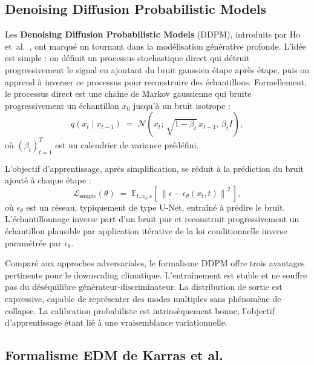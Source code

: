 \documentclass[14pt,a4paper,openany]{extreport}
\theoremstyle{definition}
\begin{document}
\subsection{Denoising Diffusion Probabilistic Models}
\label{ssec:soa-ddpm}

Les \textbf{Denoising Diffusion Probabilistic Models} (DDPM), introduits par Ho et~al.~\cite{ho_ddpm_2020}, ont marqué un tournant dans la modélisation générative profonde. L'idée est simple : on définit un processus stochastique direct qui détruit progressivement le signal en ajoutant du bruit gaussien étape après étape, puis on apprend à inverser ce processus pour reconstruire des échantillons. Formellement, le processus direct est une chaîne de Markov gaussienne qui bruite progressivement un échantillon $x_0$ jusqu'à un bruit isotrope :
\begin{equation}
  q(x_t \mid x_{t-1}) \;=\; \mathcal{N}\!\left(x_t;\, \sqrt{1 - \beta_t}\, x_{t-1},\, \beta_t I\right),
  \label{eq:ddpm-forward}
\end{equation}
où $(\beta_t)_{t=1}^{T}$ est un calendrier de variance prédéfini.

L'objectif d'apprentissage, après simplification, se réduit à la prédiction du bruit ajouté à chaque étape :
\begin{equation}
  \mathcal{L}_{\mathrm{simple}}(\theta) \;=\; \mathbb{E}_{t, x_0, \epsilon}\!\left[\,\left\| \epsilon - \epsilon_\theta(x_t, t) \right\|^2\,\right],
  \label{eq:ddpm-loss}
\end{equation}
où $\epsilon_\theta$ est un réseau, typiquement de type U-Net, entraîné à prédire le bruit. L'échantillonnage inverse part d'un bruit pur et reconstruit progressivement un échantillon plausible par application itérative de la loi conditionnelle inverse paramétrée par $\epsilon_\theta$.

Comparé aux approches adversariales, le formalisme DDPM offre trois avantages pertinents pour le downscaling climatique. L'entraînement est stable et ne souffre pas du déséquilibre générateur-discriminateur. La distribution de sortie est expressive, capable de représenter des modes multiples sans phénomène de collapse. La calibration probabiliste est intrinsèquement bonne, l'objectif d'apprentissage étant lié à une vraisemblance variationnelle.

\subsection{Formalisme EDM de Karras et al.}
\label{ssec:soa-edm}
\end{document}
